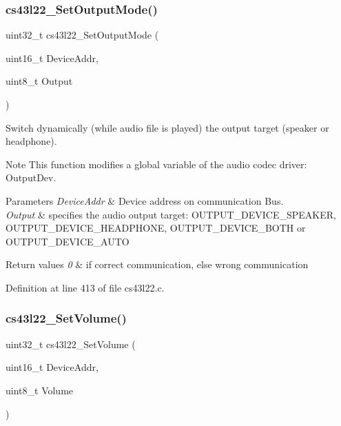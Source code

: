 \subsubsection{\texorpdfstring{cs43l22\+\_\+\+Set\+Output\+Mode()}{cs43l22\_SetOutputMode()}}
{\footnotesize\ttfamily uint32\+\_\+t cs43l22\+\_\+\+Set\+Output\+Mode (\begin{DoxyParamCaption}\item[{uint16\+\_\+t}]{Device\+Addr,  }\item[{uint8\+\_\+t}]{Output }\end{DoxyParamCaption})}



Switch dynamically (while audio file is played) the output target (speaker or headphone). 

\begin{DoxyNote}{Note}
This function modifies a global variable of the audio codec driver\+: Output\+Dev. 
\end{DoxyNote}

\begin{DoxyParams}{Parameters}
{\em Device\+Addr} & Device address on communication Bus. \\
\hline
{\em Output} & specifies the audio output target\+: O\+U\+T\+P\+U\+T\+\_\+\+D\+E\+V\+I\+C\+E\+\_\+\+S\+P\+E\+A\+K\+ER, O\+U\+T\+P\+U\+T\+\_\+\+D\+E\+V\+I\+C\+E\+\_\+\+H\+E\+A\+D\+P\+H\+O\+NE, O\+U\+T\+P\+U\+T\+\_\+\+D\+E\+V\+I\+C\+E\+\_\+\+B\+O\+TH or O\+U\+T\+P\+U\+T\+\_\+\+D\+E\+V\+I\+C\+E\+\_\+\+A\+U\+TO \\
\hline
\end{DoxyParams}

\begin{DoxyRetVals}{Return values}
{\em 0} & if correct communication, else wrong communication \\
\hline
\end{DoxyRetVals}


Definition at line 413 of file cs43l22.\+c.

\mbox{\label{group___c_s43_l22___private___functions_ga9cd060bb226e44065ec50c7803041114}} 
\subsubsection{\texorpdfstring{cs43l22\+\_\+\+Set\+Volume()}{cs43l22\_SetVolume()}}
{\footnotesize\ttfamily uint32\+\_\+t cs43l22\+\_\+\+Set\+Volume (\begin{DoxyParamCaption}\item[{uint16\+\_\+t}]{Device\+Addr,  }\item[{uint8\+\_\+t}]{Volume }\end{DoxyParamCaption})}



